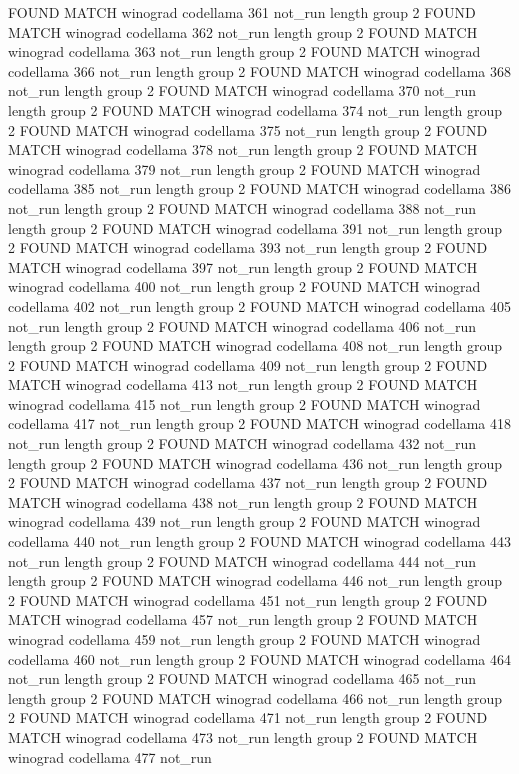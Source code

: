 FOUND MATCH winograd codellama 361 not_run
length group  2
FOUND MATCH winograd codellama 362 not_run
length group  2
FOUND MATCH winograd codellama 363 not_run
length group  2
FOUND MATCH winograd codellama 366 not_run
length group  2
FOUND MATCH winograd codellama 368 not_run
length group  2
FOUND MATCH winograd codellama 370 not_run
length group  2
FOUND MATCH winograd codellama 374 not_run
length group  2
FOUND MATCH winograd codellama 375 not_run
length group  2
FOUND MATCH winograd codellama 378 not_run
length group  2
FOUND MATCH winograd codellama 379 not_run
length group  2
FOUND MATCH winograd codellama 385 not_run
length group  2
FOUND MATCH winograd codellama 386 not_run
length group  2
FOUND MATCH winograd codellama 388 not_run
length group  2
FOUND MATCH winograd codellama 391 not_run
length group  2
FOUND MATCH winograd codellama 393 not_run
length group  2
FOUND MATCH winograd codellama 397 not_run
length group  2
FOUND MATCH winograd codellama 400 not_run
length group  2
FOUND MATCH winograd codellama 402 not_run
length group  2
FOUND MATCH winograd codellama 405 not_run
length group  2
FOUND MATCH winograd codellama 406 not_run
length group  2
FOUND MATCH winograd codellama 408 not_run
length group  2
FOUND MATCH winograd codellama 409 not_run
length group  2
FOUND MATCH winograd codellama 413 not_run
length group  2
FOUND MATCH winograd codellama 415 not_run
length group  2
FOUND MATCH winograd codellama 417 not_run
length group  2
FOUND MATCH winograd codellama 418 not_run
length group  2
FOUND MATCH winograd codellama 432 not_run
length group  2
FOUND MATCH winograd codellama 436 not_run
length group  2
FOUND MATCH winograd codellama 437 not_run
length group  2
FOUND MATCH winograd codellama 438 not_run
length group  2
FOUND MATCH winograd codellama 439 not_run
length group  2
FOUND MATCH winograd codellama 440 not_run
length group  2
FOUND MATCH winograd codellama 443 not_run
length group  2
FOUND MATCH winograd codellama 444 not_run
length group  2
FOUND MATCH winograd codellama 446 not_run
length group  2
FOUND MATCH winograd codellama 451 not_run
length group  2
FOUND MATCH winograd codellama 457 not_run
length group  2
FOUND MATCH winograd codellama 459 not_run
length group  2
FOUND MATCH winograd codellama 460 not_run
length group  2
FOUND MATCH winograd codellama 464 not_run
length group  2
FOUND MATCH winograd codellama 465 not_run
length group  2
FOUND MATCH winograd codellama 466 not_run
length group  2
FOUND MATCH winograd codellama 471 not_run
length group  2
FOUND MATCH winograd codellama 473 not_run
length group  2
FOUND MATCH winograd codellama 477 not_run
